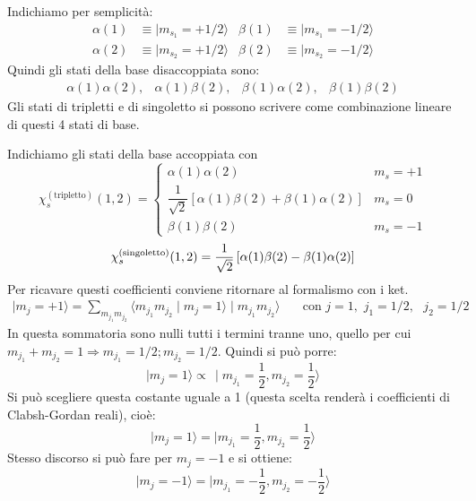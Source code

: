 Indichiamo per semplicità:
\begin{align}
\alpha (1) & \equiv \mid m_{s_{1}} = +1/2 \rangle & \beta (1) & \equiv \mid m_{s_{1}} = -1/2 \rangle \\
\alpha(2) & \equiv \mid m_{s_{2}} = +1/2 \rangle & \beta (2) & \equiv \mid m_{s_{2}} = -1/2 \rangle 
\end{align}
Quindi gli stati della base disaccoppiata sono: 
\begin{align}
\alpha (1) \alpha (2), & \alpha (1) \beta (2), & \beta (1) \alpha (2), & \beta(1) \beta (2) 
\end{align}
Gli stati di tripletti e di singoletto si possono scrivere come combinazione
lineare di questi 4 stati di base.

Indichiamo gli stati della base accoppiata con
\[
  \chi_{s}^{(\text{tripletto})} (1,2) = 
\begin{cases}
\alpha (1) \alpha(2) & m_{s} = +1 \\
\dfrac{1}{\sqrt{2}}\left[\alpha(1) \beta(2) + \beta(1)\alpha(2)\right] & m_{s}
=0 \\
\beta(1)\beta(2) & m_{s} = -1
\end{cases}
\]
\begin{equation}
  \chi_{s}^{\text{(\text{singoletto})}} (1,2) = \dfrac{1}{\sqrt{2}}\left[ \alpha(1)\beta(2) - \beta(1)\alpha(2)\right] 
\end{equation}
Per ricavare questi coefficienti conviene ritornare al formalismo con i ket.
\begin{align}
\mid m_{j} = +1 \rangle = \sum _{m_{j_{1}}m_{j_{2}}} \langle m_{j_{1}}m_{j_{2}}
\mid m_{j} = 1 \rangle \mid m_{j_{1}}m_{j_{2}}\rangle & \quad \text{con $j=1,$
  $j_{1}=1/2,$ $j_{2}=1/2$}
\end{align}
In  questa sommatoria sono nulli tutti i termini tranne uno, quello per cui
$m_{j_{1}} + m_{j_{2}} = 1 \Rightarrow m_{j_{1}} = 1/2; m_{j_{2}} = 1/2$. Quindi
si può porre:
\begin{equation}
\mid m_{j} =1 \rangle \propto\, \mid m_{j_{1}} = \dfrac{1}{2}, m_{j_{2}} =
\dfrac{1}{2} \rangle
\end{equation}
Si può scegliere questa costante uguale a 1 (questa scelta renderà i
coefficienti di Clabsh-Gordan reali), cioè:
\begin{equation}
\mid m_{j} = 1 \rangle = \mid m_{j_{1}} = \dfrac{1}{2}, m_{j_{2}} =\dfrac{1}{2} \rangle
\end{equation}
Stesso discorso si può fare per $m_{j} = -1$ e si ottiene:
\begin{equation}
\mid m_{j} = -1 \rangle = \mid m_{j_{1}} = -\dfrac{1}{2}, m_{j_{2}} =-\dfrac{1}{2} \rangle
\end{equation}
